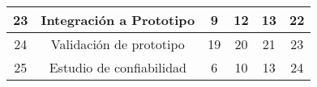 \begin{table}[H]
\begin{tabular}{|c|c|c|c|c|c|}
23          & Integración a Prototipo                 & 9                           & 12                & 13                          & 22                                        \\ \hline
24          & Validación de prototipo                 & 19                          & 20                & 21                          & 23                                        \\ \hline
25          & Estudio de confiabilidad                & 6                           & 10                & 13                          & 24                                        \\ \hline
\end{tabular}
\end{table}








